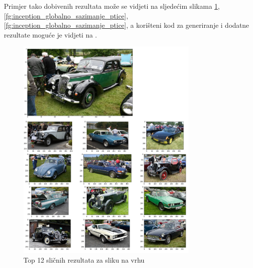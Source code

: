\documentclass[times, utf8, proizvoljni, numeric]{fer}
\begin{document}
Primjer tako dobivenih rezultata može se vidjeti na sljedećim slikama \ref{fg:inception_globalno_sazimanje_auti}, \ref{fg:inception_globalno_sazimanje_ptice}, \ref{fg:inception_globalno_sazimanje_ptice}, a korišteni kod za generiranje i dodatne rezultate moguće je vidjeti na \cite{AVSP}.

\begin{figure}[H]
	\begin{center}
		\captionsetup{justification=centering}
		\includegraphics[width=0.8\textwidth]{./imgs/inception_globalno_sazimanje_auti.png}
		\caption{Top 12 sličnih rezultata za sliku na vrhu}
		\label{fg:inception_globalno_sazimanje_auti}
	\end{center}
\end{figure}
\end{document}

